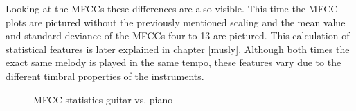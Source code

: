 \FloatBarrier
Looking at the MFCCs these differences are also visible.
This time the MFCC plots are pictured without the previously mentioned scaling and the mean value and standard deviance of the MFCCs four to 13 are pictured. This calculation of statistical features is later explained in chapter \ref{musly}. Although both times the exact same melody is played in the same tempo, these features vary due to the different timbral properties of the instruments. 
\begin{figure}[htbp]
	\centering
	\caption{MFCC statistics guitar vs. piano}	
	\label{fig:timbrmfcce}
\end{figure}
\FloatBarrier

